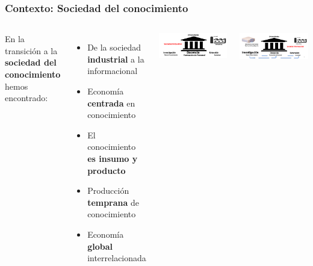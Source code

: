 \begin{frame}[fragile]
\frametitle{Contexto: Sociedad del conocimiento}
\begin{columns}[c] %

En la transición a la {\bf \color{logobrown}sociedad del conocimiento} hemos encontrado: 
\begin{itemize}
\item De la sociedad {\bf \color{logoyellow}industrial} a la informacional
\item Economía {\bf \color{LCblueInst}centrada} en conocimiento
\item El conocimiento {\bf \color{LCredInst}es insumo y producto}
\item Producción {\bf \color{LCblueSec1}temprana} de conocimiento
\item Economía {\bf \color{logobrownD}global} interrelacionada
\end{itemize}


\begin{center}
\includegraphics[scale=0.28]{imagenes/socIndustrial.png}
\end{center}

\begin{center}
\includegraphics[scale=0.28]{imagenes/socConocimiento.png}
\end{center}
\end{columns}

\end{frame}

